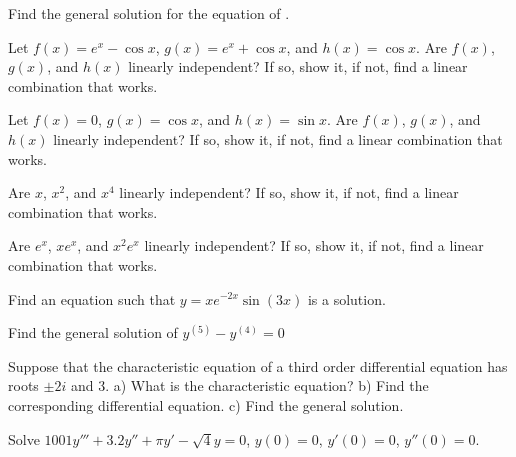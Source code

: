 \begin{exercise}
Find the general solution for the equation of .
\end{exercise}

\begin{exercise}
Let
$f(x) = e^x - \cos x$, $g(x) = e^x + \cos x$, and $h(x) = \cos x$.
Are $f(x)$, $g(x)$, and $h(x)$
linearly independent?  If so, show
it, if not, find a linear combination that works.
\end{exercise}

\begin{exercise}
Let
$f(x) = 0$, $g(x) = \cos x$, and $h(x) = \sin x$.
Are $f(x)$, $g(x)$, and $h(x)$
linearly independent?  If so, show
it, if not, find a linear combination that works.
\end{exercise}

\begin{exercise}
Are $x$, $x^2$, and $x^4$
linearly independent?  If so, show
it, if not, find a linear combination that works.
\end{exercise}

\begin{exercise}
Are $e^x$, $xe^x$, and $x^2e^x$
linearly independent?  If so, show
it, if not, find a linear combination that works.
\end{exercise}

\begin{exercise}
Find an equation such that $y=xe^{-2x}\sin(3x)$ is a solution.
\end{exercise}

\setcounter{exercise}{100}

\begin{exercise}
Find the general solution of $y^{(5)}-y^{(4)}=0$
\end{exercise}

\begin{exercise}
Suppose that the characteristic equation of a third order differential
equation has
roots $\pm 2i$ and 3.  a) What is the characteristic equation?  b) Find the
corresponding differential equation.  c) Find the general solution.
\end{exercise}

\begin{exercise}
Solve $1001y'''+3.2y''+\pi y'-\sqrt{4} y = 0$, $y(0)=0$, $y'(0) = 0$,
$y''(0) = 0$.
\end{exercise}

